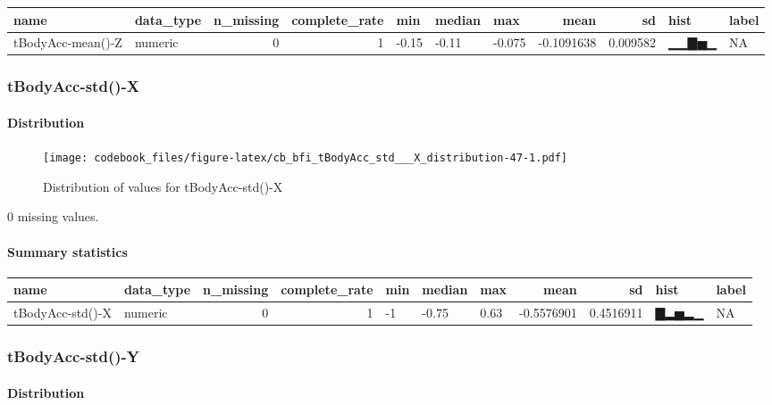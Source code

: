 \documentclass[
]{article}
\begin{document}
\begin{longtable}[]{@{}llrrlllrrll@{}}
\toprule
name & data\_type & n\_missing & complete\_rate & min & median & max &
mean & sd & hist & label \\
\midrule
\endhead
tBodyAcc-mean()-Z & numeric & 0 & 1 & -0.15 & -0.11 & -0.075 &
-0.1091638 & 0.009582 & ▁▁▇▅▁ & NA \\
\bottomrule
\end{longtable}

\hypertarget{tBodyAcc_std___X}{%
\subsubsection{tBodyAcc-std()-X}\label{tBodyAcc_std___X}}

\hypertarget{tBodyAcc_std___X_distribution}{%
\paragraph{Distribution}\label{tBodyAcc_std___X_distribution}}

\begin{figure}
\centering
\texttt{[image: codebook\_files/figure-latex/cb\_bfi\_tBodyAcc\_std\_\_\_X\_distribution-47-1.pdf]}
\caption{Distribution of values for tBodyAcc-std()-X}
\end{figure}

0 missing values.

\hypertarget{tBodyAcc_std___X_summary}{%
\paragraph{Summary statistics}\label{tBodyAcc_std___X_summary}}

\begin{longtable}[]{@{}llrrlllrrll@{}}
\toprule
name & data\_type & n\_missing & complete\_rate & min & median & max &
mean & sd & hist & label \\
\midrule
\endhead
tBodyAcc-std()-X & numeric & 0 & 1 & -1 & -0.75 & 0.63 & -0.5576901 &
0.4516911 & ▇▂▅▂▁ & NA \\
\bottomrule
\end{longtable}

\hypertarget{tBodyAcc_std___Y}{%
\subsubsection{tBodyAcc-std()-Y}\label{tBodyAcc_std___Y}}

\hypertarget{tBodyAcc_std___Y_distribution}{%
\paragraph{Distribution}\label{tBodyAcc_std___Y_distribution}}
\end{document}
